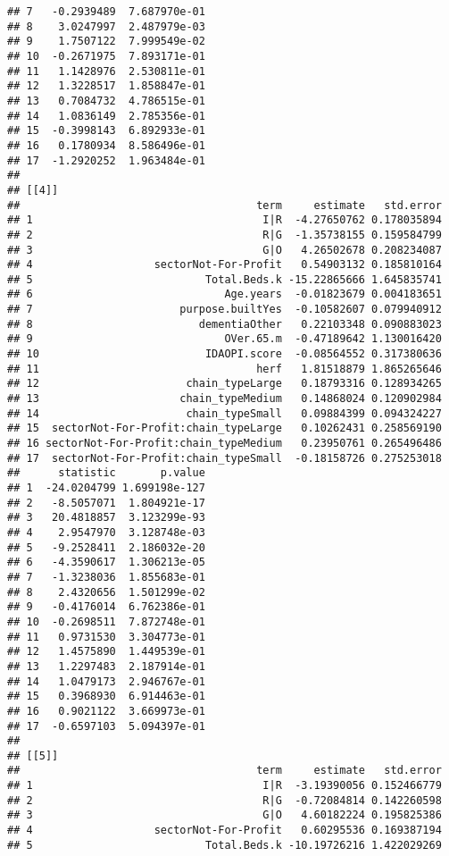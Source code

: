 \documentclass[]{article}
\begin{document}
\begin{verbatim}
## 7   -0.2939489  7.687970e-01
## 8    3.0247997  2.487979e-03
## 9    1.7507122  7.999549e-02
## 10  -0.2671975  7.893171e-01
## 11   1.1428976  2.530811e-01
## 12   1.3228517  1.858847e-01
## 13   0.7084732  4.786515e-01
## 14   1.0836149  2.785356e-01
## 15  -0.3998143  6.892933e-01
## 16   0.1780934  8.586496e-01
## 17  -1.2920252  1.963484e-01
## 
## [[4]]
##                                     term     estimate   std.error
## 1                                    I|R  -4.27650762 0.178035894
## 2                                    R|G  -1.35738155 0.159584799
## 3                                    G|O   4.26502678 0.208234087
## 4                   sectorNot-For-Profit   0.54903132 0.185810164
## 5                           Total.Beds.k -15.22865666 1.645835741
## 6                              Age.years  -0.01823679 0.004183651
## 7                       purpose.builtYes  -0.10582607 0.079940912
## 8                          dementiaOther   0.22103348 0.090883023
## 9                              OVer.65.m  -0.47189642 1.130016420
## 10                          IDAOPI.score  -0.08564552 0.317380636
## 11                                  herf   1.81518879 1.865265646
## 12                       chain_typeLarge   0.18793316 0.128934265
## 13                      chain_typeMedium   0.14868024 0.120902984
## 14                       chain_typeSmall   0.09884399 0.094324227
## 15  sectorNot-For-Profit:chain_typeLarge   0.10262431 0.258569190
## 16 sectorNot-For-Profit:chain_typeMedium   0.23950761 0.265496486
## 17  sectorNot-For-Profit:chain_typeSmall  -0.18158726 0.275253018
##      statistic       p.value
## 1  -24.0204799 1.699198e-127
## 2   -8.5057071  1.804921e-17
## 3   20.4818857  3.123299e-93
## 4    2.9547970  3.128748e-03
## 5   -9.2528411  2.186032e-20
## 6   -4.3590617  1.306213e-05
## 7   -1.3238036  1.855683e-01
## 8    2.4320656  1.501299e-02
## 9   -0.4176014  6.762386e-01
## 10  -0.2698511  7.872748e-01
## 11   0.9731530  3.304773e-01
## 12   1.4575890  1.449539e-01
## 13   1.2297483  2.187914e-01
## 14   1.0479173  2.946767e-01
## 15   0.3968930  6.914463e-01
## 16   0.9021122  3.669973e-01
## 17  -0.6597103  5.094397e-01
## 
## [[5]]
##                                     term     estimate   std.error
## 1                                    I|R  -3.19390056 0.152466779
## 2                                    R|G  -0.72084814 0.142260598
## 3                                    G|O   4.60182224 0.195825386
## 4                   sectorNot-For-Profit   0.60295536 0.169387194
## 5                           Total.Beds.k -10.19726216 1.422029269

\end{verbatim}
\end{document}
